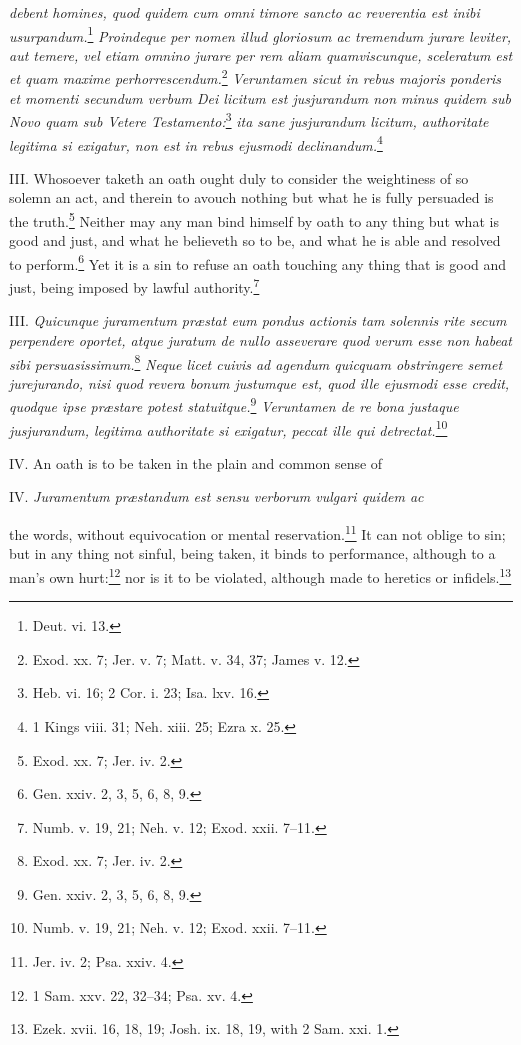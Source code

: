 \emph{debent homines, quod quidem cum omni timore sancto ac reverentia est inibi usurpandum.}\footnote{Deut. vi. 13.}\emph{ Proindeque per nomen illud gloriosum ac tremendum jurare leviter, aut temere, vel etiam omnino jurare per rem aliam quamviscunque, sceleratum est et quam maxime perhorrescendum.}\footnote{Exod. xx. 7; Jer. v. 7; Matt. v. 34, 37; James v. 12.}\emph{ Veruntamen sicut in rebus majoris ponderis et momenti secundum verbum Dei licitum est jusjurandum non minus quidem sub Novo quam sub Vetere Testamento:}\footnote{Heb. vi. 16; 2 Cor. i. 23; Isa. lxv. 16.}\emph{ ita sane jusjurandum licitum, authoritate legitima si exigatur, non est in rebus ejusmodi declinandum.}\footnote{1 Kings viii. 31; Neh. xiii. 25; Ezra x. 25.}

III. Whosoever taketh an oath ought duly to consider the weightiness of so solemn an act, and therein to avouch nothing but what he is fully persuaded is the truth.\footnote{Exod. xx. 7; Jer. iv. 2.} Neither may any man bind himself by oath to any thing but what is good and just, and what he believeth so to be, and what he is able and resolved to perform.\footnote{Gen. xxiv. 2, 3, 5, 6, 8, 9.} Yet it is a sin to refuse an oath touching any thing that is good and just, being imposed by lawful authority.\footnote{Numb. v. 19, 21; Neh. v. 12; Exod. xxii. 7–11.}

III. \emph{Quicunque juramentum præstat eum pondus actionis tam solennis rite secum perpendere oportet, atque juratum de nullo asseverare quod verum esse non habeat sibi persuasissimum.}\footnote{Exod. xx. 7; Jer. iv. 2.}\emph{ Neque licet cuivis ad agendum quicquam obstringere semet jurejurando, nisi quod revera bonum justumque est, quod ille ejusmodi esse credit, quodque ipse præstare potest statuitque.}\footnote{Gen. xxiv. 2, 3, 5, 6, 8, 9.}\emph{ Veruntamen de re bona justaque jusjurandum, legitima authoritate si exigatur, peccat ille qui detrectat.}\footnote{Numb. v. 19, 21; Neh. v. 12; Exod. xxii. 7–11.}

IV. An oath is to be taken in the plain and common sense of

IV. \emph{Juramentum præstandum est sensu verborum vulgari quidem ac }

the words, without equivocation or mental reservation.\footnote{Jer. iv. 2; Psa. xxiv. 4.} It can not oblige to sin; but in any thing not sinful, being taken, it binds to performance, although to a man's own hurt:\footnote{1 Sam. xxv. 22, 32–34; Psa. xv. 4.} nor is it to be violated, although made to heretics or infidels.\footnote{Ezek. xvii. 16, 18, 19; Josh. ix. 18, 19, with 2 Sam. xxi. 1.}

